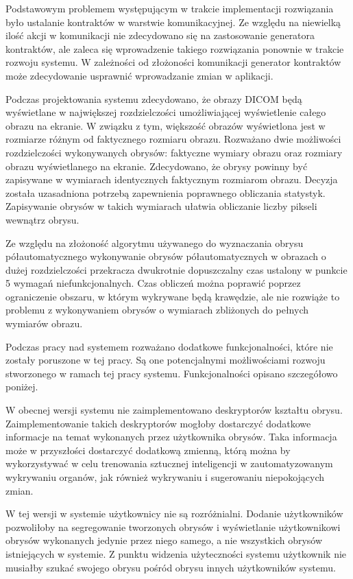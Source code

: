 \documentclass[a4paper,11pt,twoside,openright]{report}
\theoremstyle{definition}
\begin{document}
Podstawowym problemem występującym w trakcie implementacji rozwiązania było ustalanie kontraktów w warstwie komunikacyjnej. Ze względu na niewielką ilość akcji w komunikacji nie zdecydowano się na zastosowanie generatora kontraktów, ale zaleca się wprowadzenie takiego rozwiązania ponownie w trakcie rozwoju systemu. W zależności od złożoności komunikacji generator kontraktów może zdecydowanie usprawnić wprowadzanie zmian w aplikacji.

Podczas projektowania systemu zdecydowano, że obrazy DICOM będą wyświetlane w największej rozdzielczości umożliwiającej wyświetlenie całego obrazu na ekranie. W związku z tym, większość obrazów wyświetlona jest w rozmiarze różnym od faktycznego rozmiaru obrazu. Rozważano dwie możliwości rozdzielczości wykonywanych obrysów: faktyczne wymiary obrazu oraz rozmiary obrazu wyświetlanego na ekranie. Zdecydowano, że obrysy powinny być zapisywane w wymiarach identycznych faktycznym rozmiarom obrazu. Decyzja została uzasadniona potrzebą zapewnienia poprawnego obliczania statystyk. Zapisywanie obrysów w takich wymiarach ułatwia obliczanie liczby pikseli wewnątrz obrysu.

Ze względu na złożoność algorytmu używanego do wyznaczania obrysu półautomatycznego wykonywanie obrysów półautomatycznych w obrazach o dużej rozdzielczości przekracza dwukrotnie dopuszczalny czas ustalony w punkcie 5 wymagań niefunkcjonalnych. Czas obliczeń można poprawić poprzez ograniczenie obszaru, w którym wykrywane będą krawędzie, ale nie rozwiąże to problemu z wykonywaniem obrysów o wymiarach zbliżonych do pełnych wymiarów obrazu.

Podczas pracy nad systemem rozważano dodatkowe funkcjonalności, które nie zostały poruszone w tej pracy. Są one potencjalnymi możliwościami rozwoju stworzonego w ramach tej pracy systemu. Funkcjonalności opisano szczegółowo poniżej.

W obecnej wersji systemu nie zaimplementowano deskryptorów kształtu obrysu. Zaimplementowanie takich deskryptorów mogłoby dostarczyć dodatkowe informacje na temat wykonanych przez użytkownika obrysów. Taka informacja może w przyszłości dostarczyć dodatkową zmienną, którą można by wykorzystywać w celu trenowania sztucznej inteligencji w zautomatyzowanym wykrywaniu organów, jak również wykrywaniu i sugerowaniu niepokojących zmian.

W tej wersji w systemie użytkownicy nie są rozróżnialni. Dodanie użytkowników pozwoliłoby na segregowanie tworzonych obrysów i wyświetlanie użytkownikowi obrysów wykonanych jedynie przez niego samego, a nie wszystkich obrysów istniejących w systemie. Z punktu widzenia użyteczności systemu użytkownik nie musiałby szukać swojego obrysu pośród obrysu innych użytkowników systemu.
\end{document}
